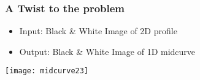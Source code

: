   
\begin{frame}[fragile]\frametitle{A Twist to the problem}

	\begin{itemize}
	\item Input: Black \& White Image of 2D profile
	\item Output: Black \& White Image of 1D midcurve
	\end{itemize}
\begin{center}
\texttt{[image: midcurve23]}
\end{center}	
\end{frame}




